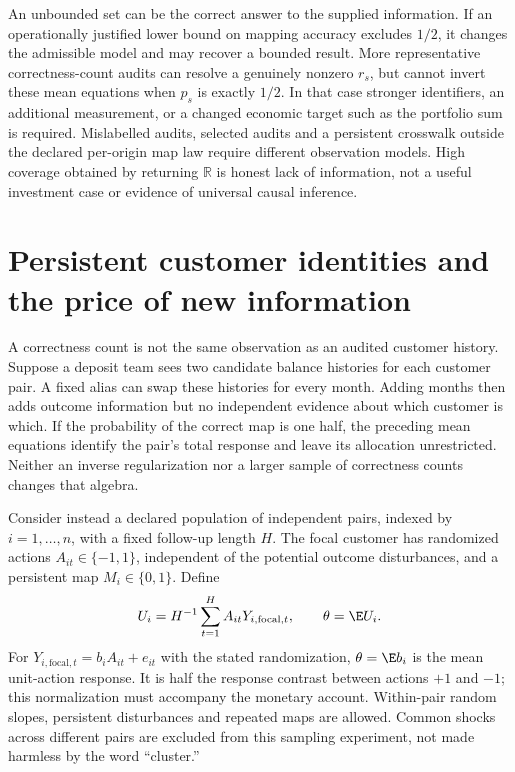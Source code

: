 

An unbounded set can be the correct answer to the supplied information.
If an operationally justified lower bound on mapping accuracy excludes
$1/2$, it changes the admissible model and may recover a bounded result.
More representative correctness-count audits can resolve a genuinely nonzero
$r_s$, but cannot invert these mean equations when $p_s$ is exactly $1/2$.
In that case stronger identifiers, an additional measurement, or a changed
economic target such as the portfolio sum is required. Mislabelled audits,
selected audits and a persistent crosswalk outside the declared per-origin
map law require different observation models. High coverage obtained by
returning $\mathbb R$ is honest lack of information, not a useful investment
case or evidence of universal causal inference.


\section{Persistent customer identities and the price of new information}
\label{c7:persistent-audits}
A correctness count is not the same observation as an audited customer
history. Suppose a deposit team sees two candidate balance histories for
each customer pair. A fixed alias can swap these histories for every month.
Adding months then adds outcome information but no independent evidence about
which customer is which. If the probability of the correct map is one half,
the preceding mean equations identify the pair's total response and leave
its allocation unrestricted. Neither an inverse regularization nor a larger
sample of correctness counts changes that algebra.

Consider instead a declared population of independent pairs, indexed by
$i=1,\ldots,n$, with a fixed follow-up length $H$. The focal customer has
randomized actions $A_{it}\in\{-1,1\}$, independent of the potential outcome
disturbances, and a persistent map $M_i\in\{0,1\}$. Define
\[
 U_i=H^{-1}\sum_{t=1}^H A_{it}Y_{i,\mathrm{focal},t},\qquad
 \theta=\E U_i.
\]
For $Y_{i,\mathrm{focal},t}=b_i A_{it}+e_{it}$ with the stated randomization,
$\theta=\E b_i$ is the mean unit-action response. It is half the response
contrast between actions $+1$ and $-1$; this normalization must accompany
the monetary account. Within-pair random slopes, persistent disturbances and
repeated maps are allowed. Common shocks across different pairs are excluded
from this sampling experiment, not made harmless by the word ``cluster.''

